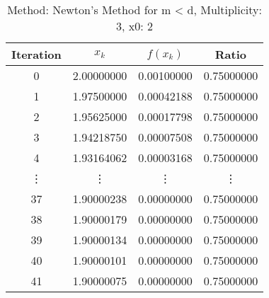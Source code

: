 \begin{table}
\centering
\caption{Method: Newton's Method for m < d, Multiplicity: 3, x0: 2}
\label{tab:table_Newton's_Method_for_m_<_d_3_2}
\begin{tabular}{c c c c}
\toprule
Iteration &      $x_k$ &   $f(x_k)$ &      Ratio \\
\midrule
        0 & 2.00000000 & 0.00100000 & 0.75000000 \\
        1 & 1.97500000 & 0.00042188 & 0.75000000 \\
        2 & 1.95625000 & 0.00017798 & 0.75000000 \\
        3 & 1.94218750 & 0.00007508 & 0.75000000 \\
        4 & 1.93164062 & 0.00003168 & 0.75000000 \\
   \vdots &     \vdots &     \vdots &     \vdots \\
       37 & 1.90000238 & 0.00000000 & 0.75000000 \\
       38 & 1.90000179 & 0.00000000 & 0.75000000 \\
       39 & 1.90000134 & 0.00000000 & 0.75000000 \\
       40 & 1.90000101 & 0.00000000 & 0.75000000 \\
       41 & 1.90000075 & 0.00000000 & 0.75000000 \\
\bottomrule
\end{tabular}
\end{table}
